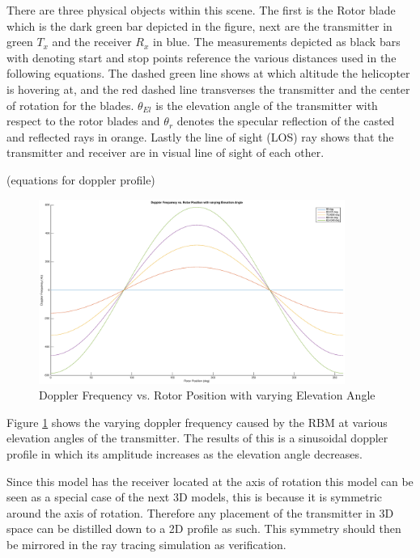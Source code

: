 There are three physical objects within this scene. The first is the Rotor blade which is the dark green bar depicted in the figure, next are the transmitter in green $T_x$ and the receiver $R_x$ in blue. The measurements depicted as black bars with denoting start and stop points reference the various distances used in the following equations. The dashed green line shows at which altitude the helicopter is hovering at, and the red dashed line transverses the transmitter and the center of rotation for the blades. $\theta_{El}$ is the elevation angle of the transmitter with respect to the rotor blades and $\theta_r$ denotes the specular reflection of the casted and reflected rays in orange. Lastly the line of sight (LOS) ray shows that the transmitter and receiver are in visual line of sight of each other.

(equations for doppler profile)

\begin{figure}
	\begin{center}
		\includegraphics[width=10cm]{images/background/2d_theoretical_doppler_profile.eps}
		\caption{Doppler Frequency vs. Rotor Position with varying Elevation Angle}
		\label{fig:2D_theoretical_doppler}
	\end{center}
\end{figure}

Figure \ref{fig:2D_theoretical_doppler} shows the varying doppler frequency caused by the RBM at various elevation angles of the transmitter. The results of this is a sinusoidal doppler profile in which its amplitude increases as the elevation angle decreases. 

Since this model has the receiver located at the axis of rotation this model can be seen as a special case of the next 3D models, this is because it is symmetric around the axis of rotation. Therefore any placement of the transmitter in 3D space can be distilled down to a 2D profile as such. This symmetry should then be mirrored in the ray tracing simulation as verification.

